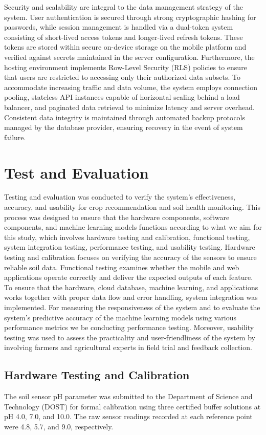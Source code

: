 {	Security and scalability are integral to the data management strategy of the system. User authentication is secured through strong cryptographic hashing for passwords, while session management is handled via a dual-token system consisting of short-lived access tokens and longer-lived refresh tokens. These tokens are stored within secure on-device storage on the mobile platform and verified against secrets maintained in the server configuration. Furthermore, the hosting environment implements Row-Level Security (RLS) policies to ensure that users are restricted to accessing only their authorized data subsets. To accommodate increasing traffic and data volume, the system employs connection pooling, stateless API instances capable of horizontal scaling behind a load balancer, and paginated data retrieval to minimize latency and server overhead. Consistent data integrity is maintained through automated backup protocols managed by the database provider, ensuring recovery in the event of system failure.
	
	\section{Test and Evaluation}
	Testing and evaluation was conducted to verify the system’s effectiveness, accuracy, and usability for crop recommendation and soil health monitoring. This process was designed to ensure that the hardware components, software components, and machine learning models functions according to what we aim for this study, which involves hardware testing and calibration, functional testing, system integration testing, performance testing, and usability testing. Hardware testing and calibration focuses on verifying the accuracy of the sensors to ensure reliable soil data. Functional testing examines whether the mobile and web applications operate correctly and deliver the expected outputs of each feature. To ensure that the hardware, cloud database, machine learning, and applications works together with proper data flow and error handling, system integration was implemented. For measuring the responsiveness of the system and to evaluate the system’s predictive accuracy of the machine learning models using various performance metrics we be conducting performance testing. Moreover, usability testing was used to assess the practicality and user-friendliness of the system by involving farmers and agricultural experts in field trial and feedback collection.
	
	\subsection{Hardware Testing and Calibration}
	The soil sensor pH parameter was submitted to the Department of Science and Technology (DOST) for formal calibration using three certified buffer solutions at pH 4.0, 7.0, and 10.0. The raw sensor readings recorded at each reference point were 4.8, 5.7, and 9.0, respectively. 
	
}
